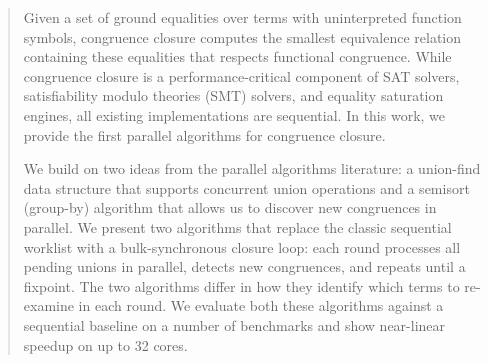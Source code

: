 \begin{abstract}
  Given a set of ground equalities over terms with uninterpreted function
  symbols, congruence closure computes the smallest equivalence relation
  containing these equalities that respects functional congruence. While
  congruence closure is a performance-critical component of SAT solvers,
  satisfiability modulo theories (SMT) solvers, and equality saturation engines,
  all existing implementations are sequential. In this work, we provide the
  first parallel algorithms for congruence closure. 
  
  We build on two ideas from the parallel algorithms literature: a union-find
  data structure that supports concurrent union operations and a semisort
  (group-by) algorithm that allows us to discover new congruences in parallel.
  We present two algorithms that replace the classic sequential worklist with a
  bulk-synchronous closure loop: each round processes all pending unions in
  parallel, detects new congruences, and repeats until a fixpoint. The two
  algorithms differ in how they identify which terms to re-examine in each
  round. We evaluate both these algorithms against a sequential baseline on a
  number of benchmarks and show near-linear speedup on up to 32 cores. 
\end{abstract}

















\balance
\newpage




